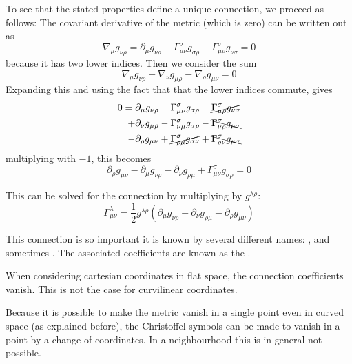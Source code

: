 To see that the stated properties define a unique connection, we proceed as follows:
The covariant derivative of the metric (which is zero) can be written out as
\[ \nabla_\mu g_{\nu\rho} = \partial_\mu g_{\nu\rho} - \Gamma_{\mu\nu}^\sigma g_{\sigma\rho} - \Gamma_{\mu\rho}^\sigma g_{\nu\sigma} = 0 \]
because it has two lower indices. Then we consider the sum
\[ \nabla_\mu g_{\nu\rho} + \nabla_\nu g_{\mu\rho} - \nabla_\rho g_{\mu\nu} = 0 \]
Expanding this and using the fact that that the lower indices commute, gives
\begin{align*}
0 = {} &\partial_\mu g_{\nu\rho} - \Gamma_{\mu\nu}^\sigma g_{\sigma\rho} - \cancel{\Gamma_{\mu\rho}^\sigma g_{\nu\sigma}} \\
+ &\partial_\nu g_{\mu\rho} - \Gamma_{\nu\mu}^\sigma g_{\sigma\rho} - \bcancel{\Gamma_{\nu\rho}^\sigma g_{\mu\sigma}} \\
- &\partial_\rho g_{\mu\nu} + \cancel{\Gamma_{\rho\mu}^\sigma g_{\sigma\nu}} + \bcancel{\Gamma_{\rho\nu}^\sigma g_{\mu\sigma}}
\end{align*}
multiplying with $-1$, this becomes
\[ \partial_{\rho}g_{\mu\nu} - \partial_{\mu}g_{\nu\rho} - \partial_{\nu}g_{\rho\mu} + \Gamma_{\mu\nu}^\sigma g_{\sigma\rho} = 0 \]

This can be solved for the connection by multiplying by $g^{\lambda\rho}$:
\[ \boxed{\Gamma^\lambda_{\mu\nu} = \frac{1}{2}g^{\lambda\rho}\left(\partial_\mu g_{\nu\rho} + \partial_\nu g_{\rho\mu}-\partial_\rho g_{\mu\nu}\right)} \]

This connection is so important it is known by several different names: ,  and sometimes . The associated coefficients are known as the .

When considering cartesian coordinates in flat space, the connection coefficients vanish. This is not the case for curvilinear coordinates.

Because it is possible to make the metric vanish in a single point even in curved space (as explained before), the Christoffel symbols can be made to vanish in a point by a change of coordinates. In a neighbourhood this is in general not possible.

